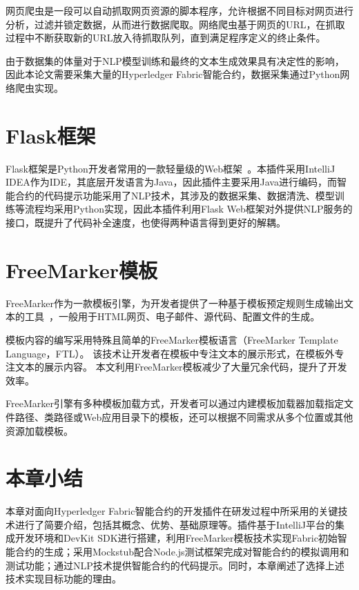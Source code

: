 网页爬虫是一段可以自动抓取网页资源的脚本程序，允许根据不同目标对网页进行分析，过滤并锁定数据，从而进行数据爬取。网络爬虫基于网页的URL，在抓取过程中不断获取新的URL放入待抓取队列，直到满足程序定义的终止条件。

由于数据集的体量对于NLP模型训练和最终的文本生成效果具有决定性的影响，因此本论文需要采集大量的Hyperledger Fabric智能合约，数据采集通过Python网络爬虫实现。

\section{Flask框架}

Flask框架是Python开发者常用的一款轻量级的Web框架~\cite{DBLP:books/daglib/0034106}。本插件采用IntelliJ IDEA作为IDE，其底层开发语言为Java，因此插件主要采用Java进行编码，而智能合约的代码提示功能采用了NLP技术，其涉及的数据采集、数据清洗、模型训练等流程均采用Python实现，因此本插件利用Flask Web框架对外提供NLP服务的接口，既提升了代码补全速度，也使得两种语言得到更好的解耦。

\section{FreeMarker模板}

FreeMarker作为一款模板引擎，为开发者提供了一种基于模板预定规则生成输出文本的工具~\cite{DBLP:journals/program/RadjenovicMS09}，一般用于HTML网页、电子邮件、源代码、配置文件的生成。

模板内容的编写采用特殊且简单的FreeMarker模板语言（FreeMarker Template Language，FTL）。
该技术让开发者在模板中专注文本的展示形式，在模板外专注文本的展示内容。
本文利用FreeMarker模板减少了大量冗余代码，提升了开发效率。

FreeMarker引擎有多种模板加载方式，开发者可以通过内建模板加载器加载指定文件路径、类路径或Web应用目录下的模板，还可以根据不同需求从多个位置或其他资源加载模板。

\section{本章小结}

本章对面向Hyperledger Fabric智能合约的开发插件在研发过程中所采用的关键技术进行了简要介绍，包括其概念、优势、基础原理等。插件基于IntelliJ平台的集成开发环境和DevKit SDK进行搭建，利用FreeMarker模板技术实现Fabric初始智能合约的生成；采用Mockstub配合Node.js测试框架完成对智能合约的模拟调用和测试功能；通过NLP技术提供智能合约的代码提示。同时，本章阐述了选择上述技术实现目标功能的理由。
